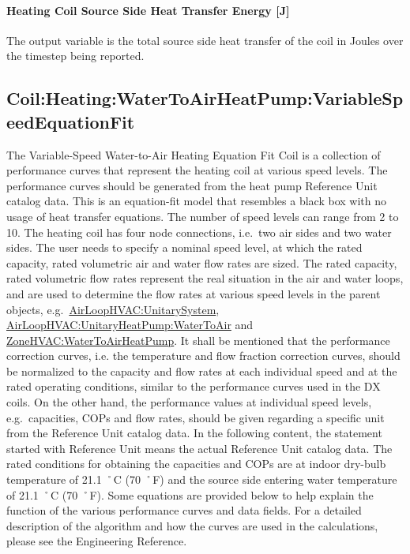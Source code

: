 \paragraph{Heating Coil Source Side Heat Transfer Energy {[}J{]}}\label{heating-coil-source-side-heat-transfer-energy-j-2}

The output variable is the total source side heat transfer of the coil in Joules over the timestep being reported.

\subsection{Coil:Heating:WaterToAirHeatPump:VariableSpeedEquationFit}\label{coilheatingwatertoairheatpumpvariablespeedequationfit}

The Variable-Speed Water-to-Air Heating Equation Fit Coil is a collection of performance curves that represent the heating coil at various speed levels. The performance curves should be generated from the heat pump Reference Unit catalog data. This is an equation-fit model that resembles a black box with no usage of heat transfer equations. The number of speed levels can range from 2 to 10. The heating coil has four node connections, i.e.~two air sides and two water sides. The user needs to specify a nominal speed level, at which the rated capacity, rated volumetric air and water flow rates are sized. The rated capacity, rated volumetric flow rates represent the real situation in the air and water loops, and are used to determine the flow rates at various speed levels in the parent objects, e.g.~\hyperref[airloophvacunitarysystem]{AirLoopHVAC:UnitarySystem}, \hyperref[airloophvacunitaryheatpumpwatertoair]{AirLoopHVAC:UnitaryHeatPump:WaterToAir} and \hyperref[zonehvacwatertoairheatpump]{ZoneHVAC:WaterToAirHeatPump}. It shall be mentioned that the performance correction curves, i.e. the temperature and flow fraction correction curves, should be normalized to the capacity and flow rates at each individual speed and at the rated operating conditions, similar to the performance curves used in the DX coils. On the other hand, the performance values at individual speed levels, e.g.~capacities, COPs and flow rates, should be given regarding a specific unit from the Reference Unit catalog data. In the following content, the statement started with Reference Unit means the actual Reference Unit catalog data. The rated conditions for obtaining the capacities and COPs are at indoor dry-bulb temperature of 21.1 ˚C (70 ˚F) and the source side entering water temperature of 21.1 ˚C (70 ˚F). Some equations are provided below to help explain the function of the various performance curves and data fields. For a detailed description of the algorithm and how the curves are used in the calculations, please see the Engineering Reference.

